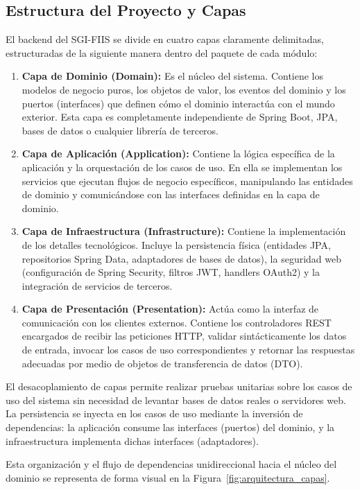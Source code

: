 \documentclass[12pt,letterpaper]{article}
\begin{document}
\subsection{Estructura del Proyecto y Capas}
El backend del SGI-FIIS se divide en cuatro capas claramente delimitadas, estructuradas de la siguiente manera dentro del paquete de cada módulo:
\begin{enumerate}
    \item \textbf{Capa de Dominio (Domain):} Es el núcleo del sistema. Contiene los modelos de negocio puros, los objetos de valor, los eventos del dominio y los puertos (interfaces) que definen cómo el dominio interactúa con el mundo exterior. Esta capa es completamente independiente de Spring Boot, JPA, bases de datos o cualquier librería de terceros.
    \item \textbf{Capa de Aplicación (Application):} Contiene la lógica específica de la aplicación y la orquestación de los casos de uso. En ella se implementan los servicios que ejecutan flujos de negocio específicos, manipulando las entidades de dominio y comunicándose con las interfaces definidas en la capa de dominio.
    \item \textbf{Capa de Infraestructura (Infrastructure):} Contiene la implementación de los detalles tecnológicos. Incluye la persistencia física (entidades JPA, repositorios Spring Data, adaptadores de bases de datos), la seguridad web (configuración de Spring Security, filtros JWT, handlers OAuth2) y la integración de servicios de terceros.
    \item \textbf{Capa de Presentación (Presentation):} Actúa como la interfaz de comunicación con los clientes externos. Contiene los controladores REST encargados de recibir las peticiones HTTP, validar sintácticamente los datos de entrada, invocar los casos de uso correspondientes y retornar las respuestas adecuadas por medio de objetos de transferencia de datos (DTO).
\end{enumerate}

El desacoplamiento de capas permite realizar pruebas unitarias sobre los casos de uso del sistema sin necesidad de levantar bases de datos reales o servidores web. La persistencia se inyecta en los casos de uso mediante la inversión de dependencias: la aplicación consume las interfaces (puertos) del dominio, y la infraestructura implementa dichas interfaces (adaptadores).

Esta organización y el flujo de dependencias unidireccional hacia el núcleo del dominio se representa de forma visual en la Figura~\ref{fig:arquitectura_capas}.
\end{document}
